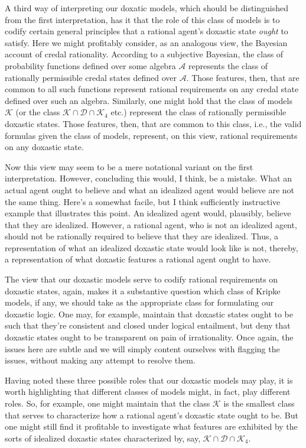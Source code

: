 A third way of interpreting our doxatic models, which should be distinguished from the first interpretation, has it that the role of this class of models is to codify certain general principles that a rational agent's doxastic state \textit{ought} to satisfy.
Here we might profitably consider, as an analogous view, the Bayesian account of credal rationality.
According to a subjective Bayesian, the class of probability functions defined over some algebra $\mathcal{A}$ represents the class of rationally permissible credal states defined over $\mathcal{A}$.
Those features, then, that are common to all such functions represent rational requirements on any credal state defined over such an algebra.
Similarly, one might hold that the class of models $\mathcal{K}$ (or the class $\mathcal{K} \cap \mathcal{D} \cap \mathcal{K}_4$ etc.) represent the class of rationally permissible doxastic states.
Those features, then, that are common to this class, i.e., the valid formulas given the class of models, represent, on this view, rational requirements on any doxastic state.

Now this view may seem to be a mere notational variant on the first interpretation.
However, concluding this would, I think, be a mistake.
What an actual agent ought to believe and what an idealized agent would believe are not the same thing.
Here's a somewhat facile, but I think sufficiently instructive example that illustrates this point.
An idealized agent would, plausibly, believe that they are idealized.
However, a rational agent, who is not an idealized agent, should not be rationally required to believe that they are idealized.
Thus, a representation of what an idealized doxastic state would look like is not, thereby, a representation of what doxastic features a rational agent ought to have.

The view that our doxastic models serve to codify rational requirements on doxastic states, again, makes it a substantive question which class of Kripke models, if any, we should take as the appropriate class for formulating our doxastic logic. 
One may, for example, maintain that doxastic states ought to be such that they're consistent and closed under logical entailment, but deny that doxastic states ought to be transparent on pain of irrationality.
Once again, the issues here are subtle and we will simply content ourselves with flagging the issues, without making any attempt to resolve them.

Having noted these three possible roles that our doxastic models may play, it is worth highlighting that different classes of models might, in fact, play different roles. 
So, for example, one might maintain that the class $\mathcal{K}$ is the smallest class that serves to characterize how a rational agent's doxastic state ought to be.
But one might still find it profitable to investigate what features are exhibited by the sorts of idealized doxastic states characterized by, say, $\mathcal{K} \cap \mathcal{D} \cap \mathcal{K}_4$.

